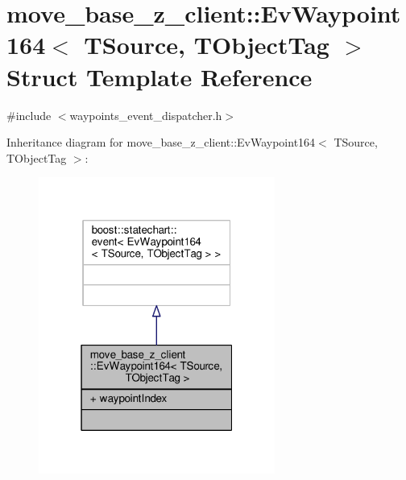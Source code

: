 \hypertarget{structmove__base__z__client_1_1EvWaypoint164}{}\section{move\+\_\+base\+\_\+z\+\_\+client\+:\+:Ev\+Waypoint164$<$ T\+Source, T\+Object\+Tag $>$ Struct Template Reference}
\label{structmove__base__z__client_1_1EvWaypoint164}


{\ttfamily \#include $<$waypoints\+\_\+event\+\_\+dispatcher.\+h$>$}



Inheritance diagram for move\+\_\+base\+\_\+z\+\_\+client\+:\+:Ev\+Waypoint164$<$ T\+Source, T\+Object\+Tag $>$\+:\nopagebreak
\begin{figure}[H]
\begin{center}
\leavevmode
\includegraphics[width=220pt]{structmove__base__z__client_1_1EvWaypoint164__inherit__graph}
\end{center}
\end{figure}


